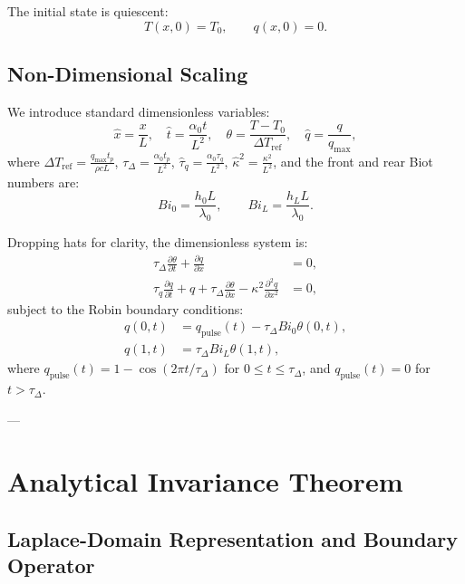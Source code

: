 \documentclass[review,12pt]{article}
\begin{document}
The initial state is quiescent:
\begin{equation}
T(x, 0) = T_0, \qquad q(x, 0) = 0. \label{eq:ic}
\end{equation}

\subsection{Non-Dimensional Scaling}

We introduce standard dimensionless variables:
\begin{equation}
\hat{x} = \frac{x}{L}, \quad \hat{t} = \frac{\alpha_0 t}{L^2}, \quad \theta = \frac{T - T_0}{\Delta T_{\mathrm{ref}}}, \quad \hat{q} = \frac{q}{q_{\max}},
\end{equation}
where $\Delta T_{\mathrm{ref}} = \frac{q_{\max} t_p}{\rho c L}$, $\tau_\Delta = \frac{\alpha_0 t_p}{L^2}$, $\hat{\tau}_q = \frac{\alpha_0 \tau_q}{L^2}$, $\hat{\kappa}^2 = \frac{\kappa^2}{L^2}$, and the front and rear Biot numbers are:
\begin{equation}
Bi_0 = \frac{h_0 L}{\lambda_0}, \qquad Bi_L = \frac{h_L L}{\lambda_0}.
\end{equation}

Dropping hats for clarity, the dimensionless system is:
\begin{align}
\tau_\Delta \frac{\partial \theta}{\partial t} + \frac{\partial q}{\partial x} &= 0, \label{eq:pde_dimless_1} \\
\tau_q \frac{\partial q}{\partial t} + q + \tau_\Delta \frac{\partial \theta}{\partial x} - \kappa^2 \frac{\partial^2 q}{\partial x^2} &= 0, \label{eq:pde_dimless_2}
\end{align}
subject to the Robin boundary conditions:
\begin{align}
q(0, t) &= q_{\mathrm{pulse}}(t) - \tau_\Delta Bi_0 \theta(0, t), \label{eq:bc_dimless_1} \\
q(1, t) &= \tau_\Delta Bi_L \theta(1, t), \label{eq:bc_dimless_2}
\end{align}
where $q_{\mathrm{pulse}}(t) = 1 - \cos(2\pi t / \tau_\Delta)$ for $0 \le t \le \tau_\Delta$, and $q_{\mathrm{pulse}}(t) = 0$ for $t > \tau_\Delta$.

---

\section{Analytical Invariance Theorem}

\subsection{Laplace-Domain Representation and Boundary Operator}
\end{document}
